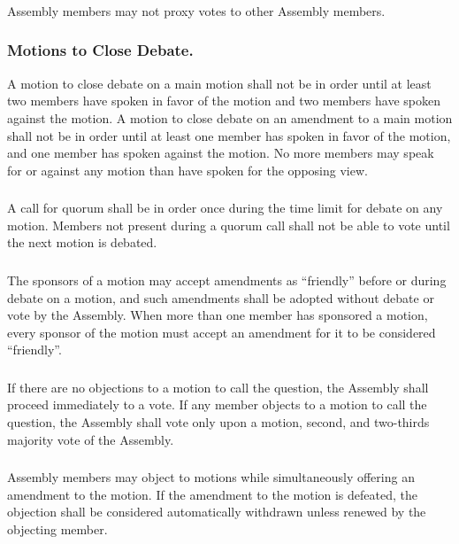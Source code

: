 \subsubsection{}
Assembly members may not proxy votes to other Assembly members.

\subsubsection{Motions to Close Debate.}
\subsubsubsection{}
A motion to close debate on a main motion shall not be in order until at least two members have spoken in favor of the motion and two members have spoken against the motion.  
\subsubsubsection{}
A motion to close debate on an amendment to a main motion shall not be in order until at least one member has spoken in favor of the motion, and one member has spoken against the motion.
\subsubsubsection{}
No more members may speak for or against any motion than have spoken for the opposing view.


\subsubsection{}
A call for quorum shall be in order once during the time limit for debate on any motion.  Members not present during a quorum call shall not be able to vote until the next motion is debated.

\subsubsection{}
The sponsors of a motion may accept amendments as “friendly” before or during debate on a motion, and such amendments shall be adopted without debate or vote by the Assembly.  When more than one member has sponsored a motion, every sponsor of the motion must accept an amendment for it to be considered “friendly”.

\subsubsection{}
If there are no objections to a motion to call the question, the Assembly shall proceed immediately to a vote.  If any member objects to a motion to call the question, the Assembly shall vote only upon a motion, second, and two-thirds majority vote of the Assembly.

\subsubsection{}
Assembly members may object to motions while simultaneously offering an amendment to the motion.  If the amendment to the motion is defeated, the objection shall be considered automatically withdrawn unless renewed by the objecting member.

